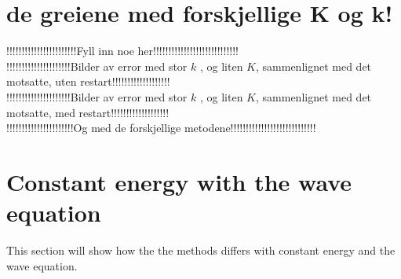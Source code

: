 \section{de greiene med forskjellige K og k!}
!!!!!!!!!!!!!!!!!!!!!!!Fyll inn noe her!!!!!!!!!!!!!!!!!!!!!!!!!!!!\\
!!!!!!!!!!!!!!!!!!!!!Bilder av error med stor $k$ , og liten $K$, sammenlignet med det motsatte, uten restart!!!!!!!!!!!!!!!!!!!\\
!!!!!!!!!!!!!!!!!!!!!Bilder av error med stor $k$ , og liten $K$, sammenlignet med det motsatte, med restart!!!!!!!!!!!!!!!!!!!\\
!!!!!!!!!!!!!!!!!!!!!!Og med de forskjellige metodene!!!!!!!!!!!!!!!!!!!!!!!!!!!!\\
 

\section{Constant energy with the wave equation}
This section will show how the the methods differs with constant energy and the wave equation.



